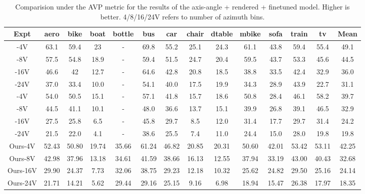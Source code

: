 \documentclass[10pt,twocolumn,letterpaper]{article}
\begin{document}
\begin{table*}[h!]
	\label{table:arp}
\end{table*}\begin{table*}[h!]
	\small
	\centering
	\begin{tabular}{|c|cccccccccccc|c|}
		\hline
		Expt & aero & bike & boat & bottle & bus & car &chair & dtable & mbike & sofa & train & tv & Mean \\
		\hline
		\cite{Tulsiani:CVPR15}-4V & 63.1 & 59.4 & 23 & - & 69.8 & 55.2 & 25.1 & 24.3 & 61.1 & 43.8 & 59.4 & 55.4 & 49.1 \\
		\cite{Tulsiani:CVPR15}-8V & 57.5 & 54.8 & 18.9 & - & 59.4 & 51.5 & 24.7 & 20.4 & 59.5 & 43.7 & 53.3 & 45.6 & 44.5 \\
		\cite{Tulsiani:CVPR15}-16V & 46.6 & 42 & 12.7 & - & 64.6 & 42.8 & 20.8 & 18.5 & 38.8 & 33.5 & 42.4 & 32.9 & 36.0 \\
		\cite{Tulsiani:CVPR15}-24V & 37.0 & 33.4 & 10.0 & - & 54.1 & 40.0 & 17.5 & 19.9 & 34.3 & 28.9 & 43.9 & 22.7 & 31.1 \\
		\hline
		\cite{Su:ICCV15}-4V & 54.0 & 50.5 & 15.1 & - & 57.1 & 41.8 & 15.7 & 18.6 & 50.8 & 28.4 & 46.1 & 58.2 & 39.7 \\
		\cite{Su:ICCV15}-8V & 44.5 & 41.1 & 10.1 & - & 48.0 & 36.6 & 13.7 & 15.1 & 39.9 & 26.8 & 39.1 & 46.5 & 32.9 \\
		\cite{Su:ICCV15}-16V & 27.5 & 25.8 & 6.5 & - & 45.8 & 29.7 & 8.5 & 12.0 & 31.4 & 17.7 & 29.7 & 31.4 & 24.2 \\
		\cite{Su:ICCV15}-24V & 21.5 & 22.0 & 4.1 & - & 38.6 & 25.5 & 7.4 & 11.0 & 24.4 & 15.0 & 28.0 & 19.8 & 19.8 \\
		\hline
		Ours-4V & 52.43 & 50.80 & 19.74 & 35.66 & 61.24 & 46.82 & 20.85 & 20.31 & 50.60 & 42.01 & 53.42 & 53.11 & 42.25 \\ 
		Ours-8V & 42.98 & 37.96 & 13.18 & 34.61 & 41.59 & 38.66 & 16.13 & 12.55 & 37.94 & 33.19 & 43.00 & 40.43 & 32.68 \\ 
		Ours-16V & 29.90 & 24.37 & 7.73 & 32.06 & 38.75 & 29.23 & 12.18 & 10.32 & 25.62 & 24.82 & 29.50 & 25.16 & 24.14 \\ 
		Ours-24V & 21.71 & 14.21 & 5.62 & 29.44 & 29.16 & 25.15 & 9.16 & 6.98 & 18.94 & 15.47 & 26.38 & 17.97 & 18.35 \\ 
		\hline
	\end{tabular}
	\caption{Comparision under the AVP metric for the results of the axis-angle + rendered + finetuned model. Higher is better. 4/8/16/24V refers to number of azimuth bins.}
	\label{table:avp}
\end{table*}
	
	
	
\end{document}

